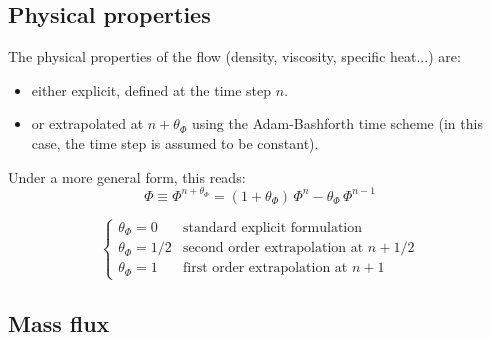 \subsection{Physical properties}

The physical properties of the flow (density, viscosity, specific heat...)
are:

\begin{itemize}
\item either explicit, defined at the time step $n$.
\item or extrapolated at $n+\theta _{\Phi }$ using the Adam-Bashforth
time scheme (in this case, the time step is assumed to be constant).
\end{itemize}

Under a more general form, this reads:
\begin{equation}
\Phi \equiv \Phi^{n+\theta_{\Phi}}=(1+\theta_{\Phi})\,\Phi^{n}-
\theta_{\Phi}\,\Phi^{n-1}
\end{equation}

\begin{equation}
\left\{%
\begin{array}{ll}
\theta_{\Phi} = 0 & \text{standard explicit formulation} \\
\theta_{\Phi} = 1/2 & \text{second order extrapolation at } n+1/2 \\
\theta_{\Phi} = 1 & \text{first order extrapolation at } n+1%
\end{array}
\right.
\end{equation}

\subsection{Mass flux}

